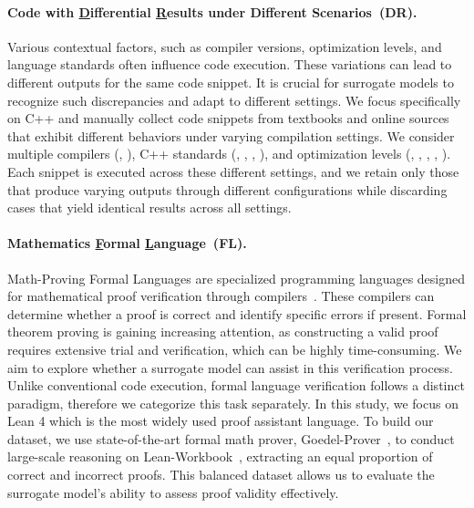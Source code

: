 \paragraph{Code with \underline{D}ifferential \underline{R}esults under Different Scenarios~(DR).}

Various contextual factors, such as compiler versions, optimization levels, and language standards often influence code execution. These variations can lead to different outputs for the same code snippet. It is crucial for surrogate models to recognize such discrepancies and adapt to different settings.
%
We focus specifically on C++ and manually collect code snippets from textbooks and online sources~\citep{10.5555/1841497, 10.5555/2423877} that exhibit different behaviors under varying compilation settings. We consider multiple compilers (, ), C++ standards (, , , ), and optimization levels (, , , , ). Each snippet is executed across these different settings, and we retain only those that produce varying outputs through different configurations while discarding cases that yield identical results across all settings.

\paragraph{Mathematics \underline{F}ormal \underline{L}anguage~(FL).}

Math-Proving Formal Languages are specialized programming languages designed for mathematical proof verification through compilers~\citep{de2015lean, moura2021lean, paulson1994isabelle, barras1997coq}. These compilers can determine whether a proof is correct and identify specific errors if present. Formal theorem proving is gaining increasing attention, as constructing a valid proof requires extensive trial and verification, which can be highly time-consuming. We aim to explore whether a surrogate model can assist in this verification process. Unlike conventional code execution, formal language verification follows a distinct paradigm, therefore we categorize this task separately.
%
In this study, we focus on Lean 4 which is the most widely used proof assistant language. To build our dataset, we use state-of-the-art formal math prover, Goedel-Prover~\citep{lin2025goedelproverfrontiermodelopensource}, to conduct large-scale reasoning on Lean-Workbook~\citep{ying2024lean}, extracting an equal proportion of correct and incorrect proofs. This balanced dataset allows us to evaluate the surrogate model's ability to assess proof validity effectively.

